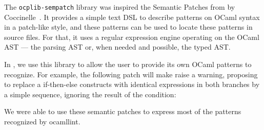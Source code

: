 The \texttt{ocplib-sempatch} library was inspired the Semantic Patches
from by Coccinelle~\cite{coccinelle}. It provides a simple text DSL to
describe patterns on OCaml syntax in a patch-like style, and these
patterns can be used to locate these patterns in source files. For
that, it uses a regular expression engine operating on the OCaml
AST --- the parsing AST or, when needed and possible, the typed AST\@.

In \ocplint{}, we use this library to allow the user to provide its
own OCaml patterns to recognize. For example, the following patch will
make \ocplint{} raise a warning, proposing to replace a {\sf
if-then-else} constructs with identical expressions in both branches
by a simple sequence, ignoring the result of the condition:



We were able to use these semantic patches to express most of the
patterns recognized by {\sf ocamllint}.


